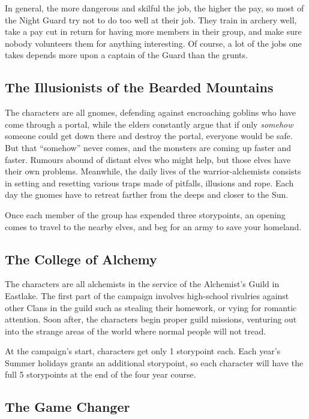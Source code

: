 {{\begin{multicols}{2}
In general, the more dangerous and skilful the job, the higher the pay, so most of the Night Guard try not to do too well at their job.
They train in archery well, take a pay cut in return for having more members in their group, and make sure nobody volunteers them for anything interesting.
Of course, a lot of the jobs one takes depends more upon a captain of the Guard than the grunts.

\subsection{The Illusionists of the Bearded Mountains}

The characters are all gnomes, defending against encroaching goblins who have come through a portal, while the elders constantly argue that if only \emph{somehow} someone could get down there and destroy the portal, everyone would be safe.
But that ``somehow'' never comes, and the monsters are coming up faster and faster.
Rumours abound of distant elves who might help, but those elves have their own problems.
Meanwhile, the daily lives of the warrior-alchemists consists in setting and resetting various traps made of pitfalls, illusions and rope.  Each day the gnomes have to retreat farther from the deeps and closer to the Sun.

Once each member of the group has expended three \glspl{storypoint}, an opening comes to travel to the nearby elves, and beg for an army to save your homeland.

\subsection{The College of Alchemy}

The characters are all alchemists in the service of the Alchemist's Guild in Eastlake.
The first part of the campaign involves high-school rivalries against other Clans in the guild such as stealing their homework, or vying for romantic attention.
Soon after, the characters begin proper guild missions, venturing out into the strange areas of the world where normal people will not tread.

At the campaign's start, characters get only 1 \gls{storypoint} each.
Each year's Summer holidays grants an additional \gls{storypoint}, so each character will have the full 5 \glspl{storypoint} at the end of the four year course.

\subsection{The Game Changer}


\end{multicols}}}
